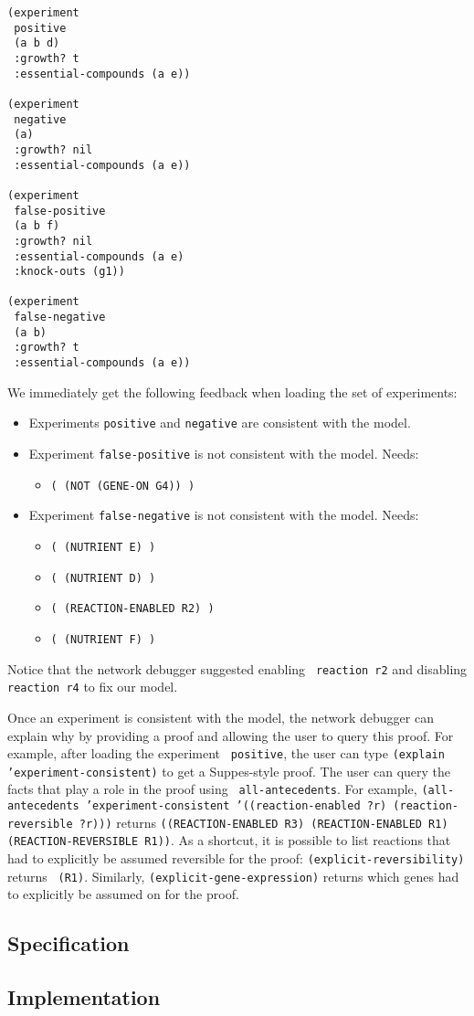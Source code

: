 \begin{lstlisting}[label={listing:experiments},caption={Experiments}]
(experiment 
 positive 
 (a b d) 
 :growth? t 
 :essential-compounds (a e))

(experiment 
 negative 
 (a) 
 :growth? nil 
 :essential-compounds (a e))

(experiment 
 false-positive 
 (a b f) 
 :growth? nil 
 :essential-compounds (a e) 
 :knock-outs (g1))

(experiment
 false-negative
 (a b)
 :growth? t
 :essential-compounds (a e))
\end{lstlisting}

We immediately get the following feedback when loading the set of
experiments:
\begin{itemize}
\item Experiments {\small\tt positive} and {\small\tt negative} are consistent with the model.
\item Experiment {\small\tt false-positive} is not consistent with the model. Needs:
\begin{itemize}
\item {\small\tt ( (NOT (GENE-ON G4)) )}
\end{itemize}
\item Experiment {\small\tt false-negative} is not consistent with the model. Needs:
\begin{itemize}
\item {\small\tt ( (NUTRIENT E) )}
\item {\small\tt ( (NUTRIENT D) )}
\item {\small\tt ( (REACTION-ENABLED R2) )}
\item {\small\tt ( (NUTRIENT F) )}
\end{itemize}
\end{itemize}

Notice that the network debugger suggested enabling {\small\tt
reaction r2} and disabling {\small\tt reaction r4} to fix our model.

Once an experiment is consistent with the model, the network debugger
can explain why by providing a proof and allowing the user to query
this proof. For example, after loading the experiment {\small\tt
positive}, the user can type {\small\tt (explain
'experiment-consistent)} to get a Suppes-style proof. The user can
query the facts that play a role in the proof using {\small\tt
all-antecedents}. For example, {\small\tt (all-antecedents
'experiment-consistent '((reaction-enabled ?r) (reaction-reversible
?r)))} returns {\small\tt ((REACTION-ENABLED R3) (REACTION-ENABLED R1)
(REACTION-REVERSIBLE R1))}. As a shortcut, it is possible to list
reactions that had to explicitly be assumed reversible for the proof:
{\small\tt (explicit-reversibility)} returns {\small\tt
(R1)}. Similarly, {\small\tt (explicit-gene-expression)} returns which
genes had to explicitly be assumed on for the proof.

\subsection{Specification}
\subsection{Implementation}
